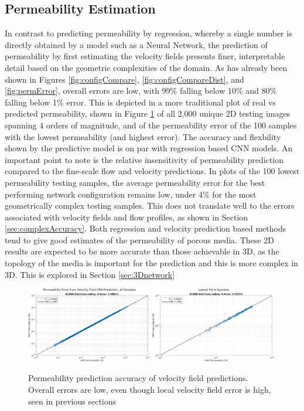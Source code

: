 \documentclass{article}
\begin{document}
\subsection{Permeability Estimation}
\label{sec:permest}
In contrast to predicting permeability by regression, whereby a single number is directly obtained by a model such as a Neural Network, the prediction of permeability by first estimating the velocity fields presents finer, interpretable detail based on the geometric complexities of the domain. As has already been shown in Figures \ref{fig:configCompare}, \ref{fig:configCompareDist}, and \ref{fig:permError}, overall errors are low, with 99\% falling below 10\% and 80\% falling below 1\% error. This is depicted in a more traditional plot of real vs predicted permeability, shown in Figure \ref{fig:permpermError} of all 2,000 unique 2D testing images spanning 4 orders of magnitude, and of the permeability error of the 100 samples with the lowest permeability (and highest error). The accuracy and flexbility shown by the predictive model is on par with regression based CNN models. An important point to note is the relative insensitivity of permeability prediction compared to the fine-scale flow and velocity predictions. In plots of the 100 lowest permeability testing samples, the average permeability error for the best performing network configuration remains low, under 4\% for the most geometrically complex testing samples. This does not translate well to the errors associated with velocity fields and flow profiles, as shown in Section \ref{sec:complexAccuracy}. Both regression and velocity prediction based methods tend to give good estimates of the permeability of porous media. These 2D results are expected to be more accurate than those achievable in 3D, as the topology of the media is important for the prediction and this is more complex in 3D. This is explored in Section \ref{sec:3Dnetwork}

\begin{figure}[htp!]
    \includegraphics[width=0.49\textwidth]{./figures/permvperm.png}
    \includegraphics[width=0.49\textwidth]{./figures/permvpermtop.png}
    \caption{Permeability prediction accuracy of velocity field predictions. Overall errors are low, even though local velocity field error is high, seen in previous sections}
    \label{fig:permpermError}
\end{figure}
\end{document}
